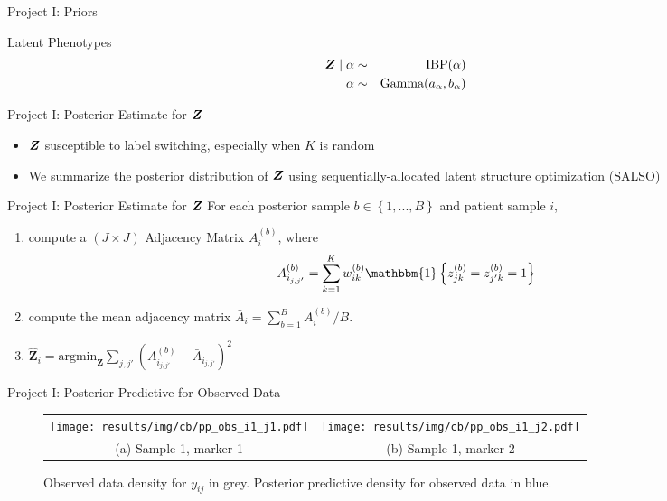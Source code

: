 \documentclass[ignorenonframetext,]{beamer}
\newcommand{\bc}[1]{ \left\{#1\right\} }
\newcommand{\bZ}{\mbox{\boldmath $Z$}}
\newcommand{\Ind}[1]{\mathbbm{1}\bc{#1}}
\begin{document}
\begin{frame}{Project I: Priors}
\begin{block}{Latent Phenotypes}
\begin{eqnarray*}
  \bZ \mid \alpha &\sim& \text{IBP}(\alpha) \\
  \alpha &\sim& \text{Gamma}(a_\alpha, b_\alpha) \\
\end{eqnarray*}
\end{block}
\end{frame}


\begin{frame}{Project I: Posterior Estimate for $\bZ$}
  \begin{itemize}
    \setlength\itemsep{1em}
    \item $\bZ$ susceptible to label switching, especially when $K$ is random
    \item We summarize the posterior distribution of $\bZ$ using sequentially-allocated latent structure optimization (SALSO) \citep{salso}
  \end{itemize}
\end{frame}

\begin{frame}{Project I: Posterior Estimate for $\bZ$}
For each posterior sample $b\in \bc{1,...,B}$ and patient sample $i$,
\begin{enumerate}
\item compute a $(J\times J)$ Adjacency Matrix $A_i^{(b)}$, where
  $$
  A^{(b)}_{i_{j,j'}} = \sum_{k=1}^K w^{(b)}_{ik} 
  \Ind{ z^{(b)}_{jk} = z^{(b)}_{j^\prime k} = 1}
  $$
\item compute the mean adjacency matrix \(\bar A_i = \sum_{b=1}^B A_i^{(b)} /
B\).
\item $\hat{\bm Z}_i = \text{argmin}_{\bm Z} \sum_{j,j'} (A_{i_{j,j'}}^{(b)} - \bar A_{i_{j,j'}})^2$
\end{enumerate}
\end{frame}

\begin{frame}{Project I: Posterior Predictive for Observed Data}
\vspace{-1em}\begin{figure}
  \begin{center}
  \begin{tabular}{cc}
  \texttt{[image: results/img/cb/pp\_obs\_i1\_j1.pdf]}&
  \texttt{[image: results/img/cb/pp\_obs\_i1\_j2.pdf]}\\
  {\small (a) Sample 1, marker 1} & {\small (b) Sample 1, marker 2} \\
  \end{tabular}
  \end{center}
  \vspace{-0.05in}
  \caption{Observed data density for $y_{ij}$ in grey. Posterior predictive density for observed data in blue.}
\end{figure}
\end{frame}
\end{document}
